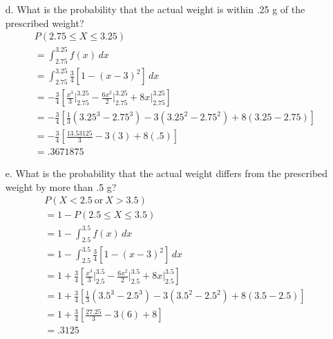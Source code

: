\documentclass[letterpaper,12pt]{article}
\begin{document}
\begin{enumerate}
\begin{enumerate}
      \item[d.]
        What is the probability that the actual weight is within .25 g of the prescribed weight?
        \begin{align*}
          &P(2.75 \le X \le 3.25) \\
          &= \int_{2.75}^{3.25} f(x)\,dx \\
          &= \int_{2.75}^{3.25} \frac{3}{4}[1 - (x - 3)^2]\,dx \\
          &= -\frac{3}{4}\left[\frac{x^3}{3}\bigg\rvert_{2.75}^{3.25} - \frac{6x^2}{2}\bigg\rvert_{2.75}^{3.25} + 8x\big\rvert_{2.75}^{3.25}\right] \\
          &= -\frac{3}{4}\left[\frac{1}{3}(3.25^3 - 2.75^3) - 3(3.25^2 - 2.75^2) + 8(3.25 - 2.75)\right] \\
          &= -\frac{3}{4}\left[\frac{13.53125}{3} - 3(3) + 8(.5)\right] \\
          &= .3671875
        \end{align*}
      \item[e.]
        What is the probability that the actual weight differs from the prescribed weight by more than .5 g?
        \begin{align*}
          &P(X < 2.5\ \text{or}\ X > 3.5) \\
          &= 1 - P(2.5 \le X \le 3.5) \\
          &= 1 - \int_{2.5}^{3.5} f(x)\,dx \\
          &= 1 - \int_{2.5}^{3.5} \frac{3}{4}[1 - (x - 3)^2]\,dx \\
          &= 1 +\frac{3}{4}\left[\frac{x^3}{3}\bigg\rvert_{2.5}^{3.5} - \frac{6x^2}{2}\bigg\rvert_{2.5}^{3.5} + 8x\big\rvert_{2.5}^{3.5}\right] \\
          &= 1 + \frac{3}{4}\left[\frac{1}{3}(3.5^3 - 2.5^3) - 3(3.5^2 - 2.5^2) + 8(3.5 - 2.5)\right] \\
          &= 1 + \frac{3}{4}\left[\frac{27.25}{3} - 3(6) + 8\right] \\
          &= .3125
        \end{align*}
    \end{enumerate}
  \end{enumerate}
\end{document}
